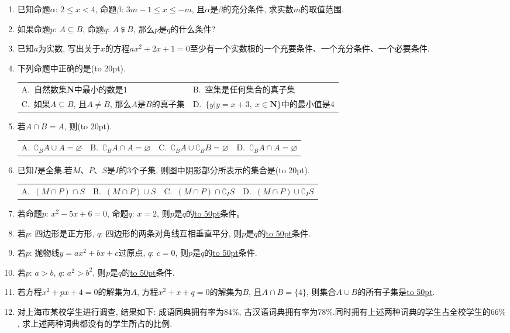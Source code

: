 \documentclass[10pt,a4paper]{article}
\newcommand{\blank}[1]{\underline{\hbox to #1pt{}}}
\newcommand{\bracket}[1]{(\hbox to #1pt{})}
\newcommand{\twoch}[4]{\par\begin{tabular}{p{.46\textwidth}p{.46\textwidth}}
A.~#1& B.~#2\\
C.~#3& D.~#4
\end{tabular}}
\newcommand{\fourch}[4]{\par\begin{tabular}{p{.23\textwidth}p{.23\textwidth}p{.23\textwidth}p{.23\textwidth}}
A.~#1 &B.~#2& C.~#3& D.~#4
\end{tabular}}
\begin{document}
\begin{enumerate}[1.]
\item 已知命题$\alpha$: $2\le x<4$, 命题$\beta$: $3m-1\le x\le -m$, 且$\alpha$是$\beta$的充分条件, 求实数$m$的取值范围.
\item 如果命题$p$: $A\subseteq B$, 命题$q$: $A\subsetneqq B$, 那么$p$是$q$的什么条件?
\item 已知$a$为实数, 写出关于$x$的方程$ax^2+2x+1=0$至少有一个实数根的一个充要条件、一个充分条件、一个必要条件.
\item 下列命题中正确的是\bracket{20}.
\twoch{自然数集$\mathbf{N}$中最小的数是$1$}{空集是任何集合的真子集}{如果$A\subseteq B$, 且$A\ne B$, 那么$A$是$B$的真子集}{$\{y|y=x+3,\ x\in \mathbf{N}\}$中的最小值是4}
\item 若$A\cap B=A$, 则\bracket{20}.
\fourch{$\complement _BA\cup A=\varnothing$}{$\complement _BA\cap A=\varnothing$}{$\complement _BA\cup \complement _BB=\varnothing$}{$\complement _BA\cap A=\varnothing$}
\item 已知$I$是全集.若$M$、$P$、$S$是$I$的3个子集, 则图中阴影部分所表示的集合是\bracket{20}.
\begin{center}
\end{center}
\fourch{$(M\cap P)\cap S$}{$(M\cap P)\cup S$}{$(M\cap P)\cap \complement _IS$}{$(M\cap P)\cup \complement _IS$}
\item 若命题$p$: $x^2-5x+6=0$, 命题$q$: $x=2$, 则$p$是$q$的\blank{50}条件。
\item 若$p$: 四边形是正方形, $q$: 四边形的两条对角线互相垂直平分, 则$p$是$q$的\blank{50}条件.
\item 若$p$: 抛物线$y=ax^2+bx+c$过原点, $q$: $c=0$, 则$p$是$q$的\blank{50}条件.
\item 若$p$: $a>b$, $q$: $a^2>b^2$, 则$p$是$q$的\blank{50}条件.
\item 若方程$x^2+px+4=0$的解集为$A$, 方程$x^2+x+q=0$的解集为$B$, 且$A\cap B=\{4\}$, 则集合$A\cup B$的所有子集是\blank{50}.
\item 对上海市某校学生进行调查, 结果如下: 成语同典拥有率为$84\%$, 古汉语词典拥有率为$78\%$.同时拥有上述两种词典的学生占全校学生的$66\%$, 求上述两种词典都没有的学生所占的比例.

\end{enumerate}
\end{document}

